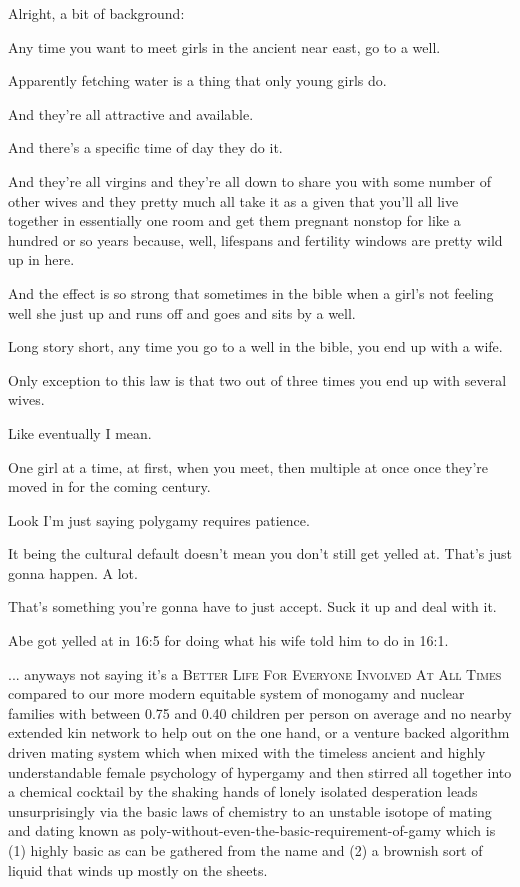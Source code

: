 {
}
{
}
{
	Alright, a bit of background:

	Any time you want to meet girls in the ancient near east, go to a well.

	Apparently fetching water is a thing that only young girls do.

	And they're all attractive and available.

	And there's a specific time of day they do it.

	And they're all virgins and they're all down to share you with some number of other wives and they pretty much all take it as a given that you'll all live together in essentially one room and get them pregnant nonstop for like a hundred or so years because, well, lifespans and fertility windows are pretty wild up in here.

	And the effect is so strong that sometimes in the bible when a girl's not feeling well she just up and runs off and goes and sits by a well.

	Long story short, any time you go to a well in the bible, you end up with a wife.

	Only exception to this law is that two out of three times you end up with several wives.

	Like eventually I mean.

	One girl at a time, at first, when you meet, then multiple at once once they're moved in for the coming century.

	Look I'm just saying polygamy requires patience.

	It being the cultural default doesn't mean you don't still get yelled at. That's just gonna happen. A lot.

	That's something you're gonna have to just accept. Suck it up and deal with it.

	Abe got yelled at in 16:5 for doing what his wife told him to do in 16:1.

	... anyways not saying it's a \textsc{Better Life For Everyone Involved At All Times} compared to our more modern equitable system of monogamy and nuclear families with between 0.75 and 0.40 children per person on average and no nearby extended kin network to help out on the one hand, or a venture backed algorithm driven mating system which when mixed with the timeless ancient and highly understandable female psychology of hypergamy and then stirred all together into a chemical cocktail by the shaking hands of lonely isolated desperation leads unsurprisingly via the basic laws of chemistry to an unstable isotope of mating and dating known as poly-without-even-the-basic-requirement-of-gamy which is (1) highly basic as can be gathered from the name and (2) a brownish sort of liquid that winds up mostly on the sheets.
}

